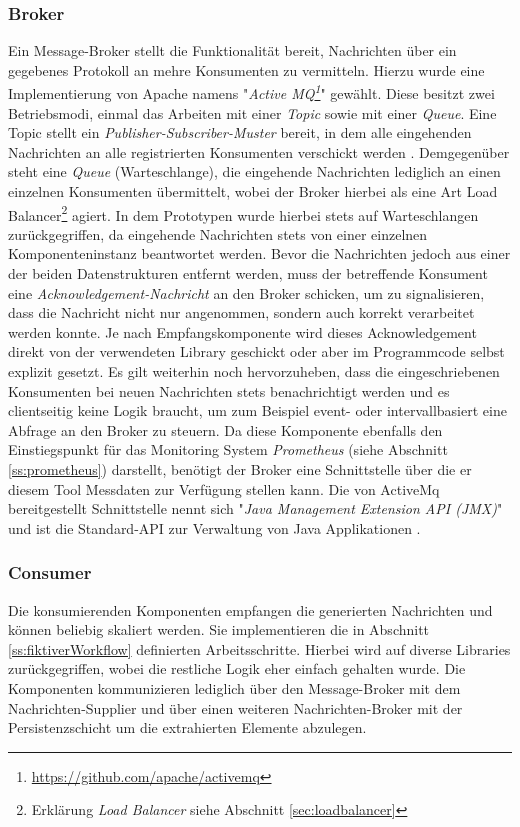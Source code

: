 \subsubsection{Broker \checkmark}
Ein Message-Broker stellt die Funktionalität bereit, Nachrichten über ein gegebenes Protokoll an mehre Konsumenten zu vermitteln. Hierzu wurde eine Implementierung von Apache namens "\emph{Active MQ\footnote{\url{https://github.com/apache/activemq}}}" gewählt. Diese besitzt zwei Betriebsmodi, einmal das Arbeiten mit einer \emph{Topic} sowie mit einer \emph{Queue}. Eine Topic stellt ein \emph{Publisher-Subscriber-Muster} bereit, in dem alle eingehenden Nachrichten an alle registrierten Konsumenten verschickt werden \cite[Seite~33 ff.]{activemq-snyder}. Demgegenüber steht eine \emph{Queue} (Warteschlange), die eingehende Nachrichten lediglich an einen einzelnen Konsumenten übermittelt, wobei der Broker hierbei als eine Art Load Balancer\footnote{Erklärung \emph{Load Balancer} siehe Abschnitt \ref{sec:loadbalancer}} agiert. In dem Prototypen wurde hierbei stets auf Warteschlangen zurückgegriffen, da eingehende Nachrichten stets von einer einzelnen Komponenteninstanz beantwortet werden. Bevor die Nachrichten jedoch aus einer der beiden Datenstrukturen entfernt werden, muss der betreffende Konsument eine \emph{Acknowledgement-Nachricht} an den Broker schicken, um zu signalisieren, dass die Nachricht nicht nur angenommen, sondern auch korrekt verarbeitet werden konnte. Je nach Empfangskomponente wird dieses Acknowledgement direkt von der verwendeten Library geschickt oder aber im Programmcode selbst explizit gesetzt. Es gilt weiterhin noch hervorzuheben, dass die eingeschriebenen Konsumenten bei neuen Nachrichten stets benachrichtigt werden und es clientseitig keine Logik braucht, um zum Beispiel event- oder intervallbasiert eine Abfrage an den Broker zu steuern. Da diese Komponente ebenfalls den Einstiegspunkt für das Monitoring System \emph{Prometheus} (siehe Abschnitt \ref{ss:prometheus}) darstellt, benötigt der Broker eine Schnittstelle über die er diesem Tool Messdaten zur Verfügung stellen kann. Die von ActiveMq bereitgestellt Schnittstelle nennt sich "\emph{Java Management Extension API (JMX)}" und ist die Standard-API zur Verwaltung von Java Applikationen \cite[Seite~331 ff.]{activemq-snyder}.


\subsubsection{Consumer \checkmark}
Die konsumierenden Komponenten empfangen die generierten Nachrichten und können beliebig skaliert werden. Sie implementieren die in Abschnitt \ref{ss:fiktiverWorkflow} definierten Arbeitsschritte. Hierbei wird auf diverse Libraries zurückgegriffen, wobei die restliche Logik eher einfach gehalten wurde. Die Komponenten kommunizieren lediglich über den Message-Broker mit dem Nachrichten-Supplier und über einen weiteren Nachrichten-Broker mit der Persistenzschicht um die extrahierten Elemente abzulegen.


